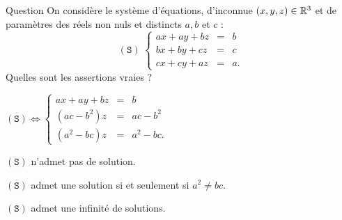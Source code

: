 \begin{multi}[multiple,feedback=
{Comme \(a,b\) et \(c\) sont des réels non nuls, 
\[(\mathtt{S}) \Leftrightarrow  
\left\{\begin{array}{rcc}
ax+ay+bz&=&b\\
(ac-b^2)z&=&ac-b^2\\ 
(a^2-bc)z&=&a^2-bc.\\ 
\end{array}\right.\]
D'autre part, \(a,b,c\) sont des réels distincts, on vérifie que \(a^2\neq bc\) ou \(b^2 \neq ac\). Par conséquent, 
\((\mathtt{S})\) admet une infinité de solutions :
\(\{(x,-x,1); \; x \in \Rr\}\).
}]{Question}
On considère le système d'équations, d'inconnue \((x,y,z)\in \mathbb{R}^3\) et de paramètres des réels non nuls et distincts \(a,b\) et \(c\) :
\[(\mathtt{S}) \; \left\{\begin{array}{rcc}
ax+ay+bz&=&b\\
bx+by+cz&=&c\\ 
cx+cy+az&=&a.\end{array}\right.\]
Quelles sont les assertions vraies ?

    \item* \((\mathtt{S}) \Leftrightarrow
\left\{\begin{array}{rcc}
ax+ay+bz&=&b\\
(ac-b^2)z&=&ac-b^2\\
(a^2-bc)z&=&a^2-bc.\end{array}\right.\)
    \item \((\mathtt{S})\) n'admet pas de solution.
    \item \((\mathtt{S})\) admet une solution si et seulement si \(a^2\neq bc\).
    \item* \((\mathtt{S})\) admet une infinité de solutions.
\end{multi}



